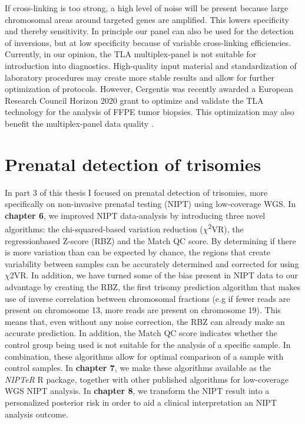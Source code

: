 If cross-linking is too strong, a high level of noise will be present because large chromosomal areas around targeted genes are amplified. 
This lowers specificity and thereby sensitivity. 
In principle our panel can also be used for the detection of inversions, but at low specificity because of variable cross-linking efficiencies. 
Currently, in our opinion, the TLA multiplex-panel is not suitable for introduction into diagnostics. 
High-quality input material and standardization of laboratory procedures may create more stable results and allow for further optimization of protocols. 
However, Cergentis was recently awarded a European Research Council Horizon 2020 grant to optimize and validate the TLA technology for the analysis of FFPE tumor biopsies. 
This optimization may also benefit the multiplex-panel data quality \cite{Cergentis_2018}.

\section{Prenatal detection of trisomies} \label{Prenatal}
In part 3 of this thesis I focused on prenatal detection of trisomies, more specifically on non-invasive prenatal testing (NIPT) using low-coverage WGS. 
In \textbf{chapter 6}, we improved NIPT data-analysis by introducing three novel algorithms: the chi-squared-based variation reduction ($\chi$\textsuperscript{2}VR), the regressionbased Z-score (RBZ) and the Match QC score. 
By determining if there is more variation than can be expected by chance, the regions that create variability between samples can be accurately determined and corrected for using $\chi$2VR.
In addition, we have turned some of the bias present in NIPT data to our advantage by creating the RBZ, the first trisomy prediction algorithm that makes use of inverse correlation between chromosomal fractions (e.g if fewer reads are present on chromosome 13, more reads are present on chromosome 19).
This means that, even without any noise correction, the RBZ can already make an accurate prediction. 
In addition, the Match QC score indicates whether the control group being used is not suitable for the analysis of a specific sample. 
In combination, these algorithms allow for optimal comparison of a sample with control samples. 
In \textbf{chapter 7}, we make these algorithms available as the \textsl{NIPTeR} R package, together with other published algorithms for low-coverage WGS NIPT analysis. 
In \textbf{chapter 8}, we transform the NIPT result into a personalized posterior risk in order to aid a clinical interpretation an NIPT analysis outcome.

